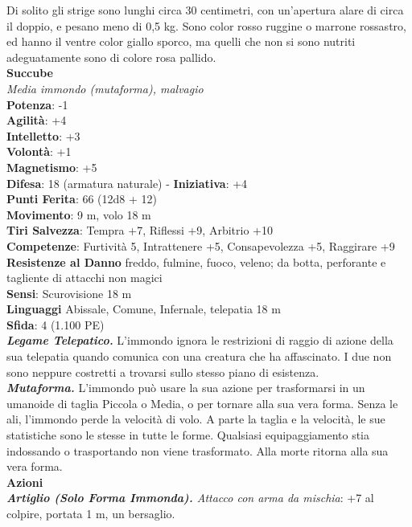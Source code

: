 \begin{multicols}{2}
Di solito gli strige sono lunghi circa 30 centimetri, con un'apertura alare di circa il doppio, e pesano meno di 0,5 kg. Sono color rosso ruggine o marrone rossastro, ed hanno il ventre color giallo sporco, ma quelli che non si sono nutriti adeguatamente sono di colore rosa pallido.\\


\medskip\textbf{Succube}\\
\emph{Media immondo (mutaforma), malvagio}\\
\textbf{Potenza}: -1\\
\textbf{Agilità}: +4\\
\textbf{Intelletto}: +3\\
\textbf{Volontà}: +1\\
\textbf{Magnetismo}: +5\\
\textbf{Difesa}: 18 (armatura naturale) - \textbf{Iniziativa}: +4\\
\textbf{Punti Ferita}: 66 (12d8 + 12)\\
\textbf{Movimento}: 9 m, volo 18 m\\
\textbf{Tiri Salvezza}: Tempra +7, Riflessi +9, Arbitrio +10\\
\textbf{Competenze}: Furtività 5, Intrattenere +5, Consapevolezza +5, Raggirare +9\\
\textbf{Resistenze al Danno} freddo, fulmine, fuoco, veleno; da botta, perforante e tagliente di attacchi non magici\\
\textbf{Sensi}: Scurovisione 18 m\\
\textbf{Linguaggi} Abissale, Comune, Infernale, telepatia 18 m \\
\textbf{Sfida}: 4 (1.100 PE)\smallskip\\
\emph{\textbf{Legame Telepatico.}} L'immondo ignora le restrizioni di raggio di azione della sua telepatia quando comunica con una creatura che ha affascinato. I due non sono neppure costretti a trovarsi sullo stesso piano di esistenza.\\
\emph{\textbf{Mutaforma.}} L'immondo può usare la sua azione per trasformarsi in un umanoide di taglia Piccola o Media, o per tornare alla sua vera forma. Senza le ali, l'immondo perde la velocità di volo. A parte la taglia e la velocità, le sue statistiche sono le stesse in tutte le forme. Qualsiasi equipaggiamento stia indossando o trasportando non viene trasformato. Alla morte ritorna alla sua vera forma. \\
\smallskip\textbf{Azioni}\\
\emph{\textbf{Artiglio (Solo Forma Immonda).} Attacco con arma da mischia}: +7 al colpire, portata 1 m, un bersaglio.\\

\end{multicols}
